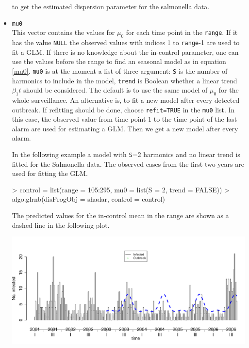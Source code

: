 \documentclass[a4paper,11pt]{article}
\begin{document}
\begin{itemize}
to get the estimated dispersion parameter for the salmonella data.

\item \verb+mu0+ \\
This vector contains the values for $\mu_0$ for each time point in the \verb+range+. If it has the value \verb+NULL+  the observed values with indices 1 to \verb+range+-1 are used to fit a GLM. If there is no knowledge about the in-control parameter, one can use the values before the range to find an seasonal model as in equation \ref{mu0}. \verb+mu0+ is at the moment a list of three argument: \verb+S+ is the number of harmonics to include in the model, \verb+trend+ is Boolean whether a linear trend $\beta_1t$ should be considered. The default is to use the same model of $\mu_0$ for the whole surveillance. An alternative is, to fit a new model after every detected outbreak. If refitting should be done, choose \verb+refit=TRUE+ in the \verb+mu0+ list. In this case, the observed value from time point 1 to the time point of the last alarm are used for estimating a GLM. Then we get a new model after every alarm. 


In the following example a model with \verb+S+=2 harmonics and no linear trend is fitted for the Salmonella data. The observed cases from the first two years are used for fitting the GLM. 
   
\begin{Schunk}
\begin{Sinput}
> control = list(range = 105:295, mu0 = list(S = 2, trend = FALSE))
> algo.glrnb(disProgObj = shadar, control = control)
\end{Sinput}
\end{Schunk}


The predicted values for the in-control mean in the range are shown as a dashed line in the following plot.

\begin{Schunk}
\end{Schunk}
\includegraphics{figs/vignette_glrnb-012}



\end{itemize}
\end{document}

